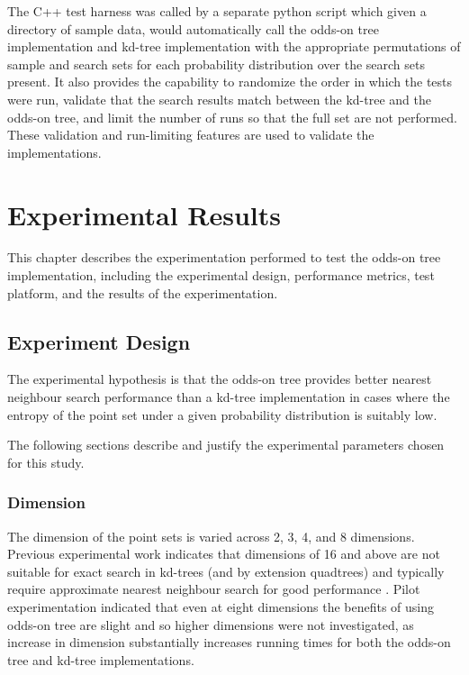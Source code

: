 \documentclass[mcs]{scsthesis}
\begin{document}
The C++ test harness was called by a separate python script which given a
directory of sample data, would automatically call the odds-on tree
implementation and kd-tree implementation with the appropriate permutations of
sample and search sets for each probability distribution over the search sets
present. It also provides the capability to randomize the order in which the
tests were run, validate that the search results match between the kd-tree and
the odds-on tree, and limit the number of runs so that the full set are not
performed. These validation and run-limiting features are used to validate the
implementations.

\chapter{Experimental Results}

This chapter describes the experimentation performed to test the odds-on tree
implementation, including the experimental design, performance metrics, test
platform, and the results of the experimentation.

\section{Experiment Design}

The experimental hypothesis is that the odds-on tree provides better nearest
neighbour search performance than a kd-tree implementation in cases where the
entropy of the point set under a given probability distribution is suitably low.

The following sections describe and justify the experimental parameters chosen
for this study.

\subsection{Dimension}

The dimension of the point sets is varied across 2, 3, 4, and 8 dimensions.
Previous experimental work indicates that dimensions of 16 and above are not
suitable for exact search in kd-trees (and by extension quadtrees) and typically 
require approximate nearest neighbour search for good performance \cite{app-ann}.
Pilot experimentation indicated that even at eight dimensions the benefits of
using odds-on tree are slight and so higher dimensions were not investigated, as
increase in dimension substantially increases running times for both the
odds-on tree and kd-tree implementations.
\end{document}
